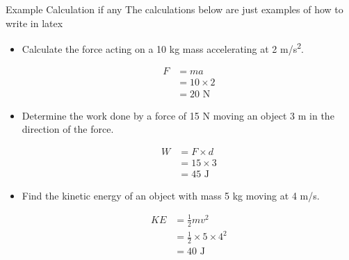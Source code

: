 Example Calculation if any
\newline
\newline
The calculations below are just examples of how to write in latex


\begin{itemize}
	\item Calculate the force acting on a 10 kg mass accelerating at 2 m/s\textsuperscript{2}.  %

	      \begin{align*}
		      F & = ma           \\
		        & = 10 \times 2  \\
		        & = 20 \text{ N}
	      \end{align*}

	\item Determine the work done by a force of 15 N moving an object 3 m in the direction of the force.  %

	      \begin{align*}
		      W & = F \times d   \\
		        & = 15 \times 3  \\
		        & = 45 \text{ J}
	      \end{align*}

	\item Find the kinetic energy of an object with mass 5 kg moving at 4 m/s.  %

	      \begin{align*}
		      KE & = \frac{1}{2} m v^2               \\
		         & = \frac{1}{2} \times 5 \times 4^2 \\
		         & = 40 \text{ J}
	      \end{align*}
\end{itemize}

